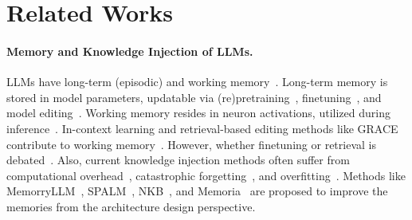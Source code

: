 \section{Related Works}\label{sec:related_works}
\paragraph{Memory and Knowledge Injection of LLMs.}
LLMs have long-term (episodic) and working memory~\cite{llm_controllable_working_memory,memoria,spalm}. Long-term memory is stored in model parameters, updatable via (re)pretraining~\cite{gpt-1}, finetuning~\cite{lora}, and model editing~\cite{knowledge_editing_survey_1}. Working memory resides in neuron activations, utilized during inference~\cite{llm_controllable_working_memory}. In-context learning and retrieval-based editing methods like GRACE contribute to working memory~\cite{chain_of_thoughts,grace}. However, whether finetuning or retrieval is debated~\cite{ft_vs_rag,fewshotft_vs_icl}. Also, current knowledge injection methods often suffer from computational overhead~\cite{llama-2,grace}, catastrophic forgetting~\cite{catastrophic_forgetting_llm}, and overfitting~\cite{memorization_overfitting}. Methods like MemorryLLM~\cite{memoryllm}, SPALM~\cite{spalm}, NKB~\cite{knowledge_bank}, and Memoria~\cite{memoria} are proposed to improve the memories from the architecture design perspective.

